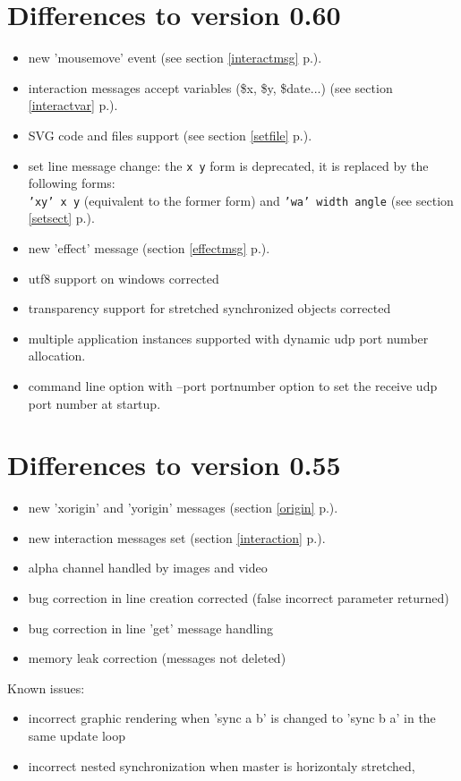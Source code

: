 \documentclass[a4paper,twoside]{report}
\newcommand{\sublevel}[1]	{\section{#1}}
\newcommand{\fullref}[1]	{\ref{#1} p.\pageref{#1}}
\newcommand{\OSC}[1]		{\texttt{#1}}
\begin{document}
\sublevel{Differences to version 0.60}
\begin{itemize}
\item new 'mousemove' event (see section \fullref{interactmsg}).
\item interaction messages accept variables (\$x, \$y, \$date...) (see section \fullref{interactvar}).
\item SVG code and files support (see section \fullref{setfile}).
\item set line message change: the \OSC{x y} form is deprecated, it is replaced by
  the following forms: \\
  \OSC{'xy' x y} (equivalent to the former form) 
  and \OSC{'wa' width angle}   
  (see section \fullref{setsect}).
\item new 'effect' message  (section \fullref{effectmsg}).
\item utf8 support on windows corrected
\item transparency support for stretched synchronized objects corrected
\item multiple application instances supported with dynamic udp port number allocation.
\item command line option with --port portnumber option to set the receive udp port number at startup.
\end{itemize}

\sublevel{Differences to version 0.55}
\begin{itemize}
\item new 'xorigin' and 'yorigin' messages (section \fullref{origin}).
\item new interaction messages set (section \fullref{interaction}).
\item alpha channel handled by images and video
\item bug correction in line creation corrected (false incorrect parameter returned)
\item bug correction in line 'get' message handling
\item memory leak correction (messages not deleted)
\end{itemize}

Known issues: 
\begin{itemize}
\item incorrect graphic rendering when 'sync a b' is changed to 'sync b a' in the same update loop
\item incorrect nested synchronization when master is horizontaly stretched,
\end{itemize}
\end{document}
